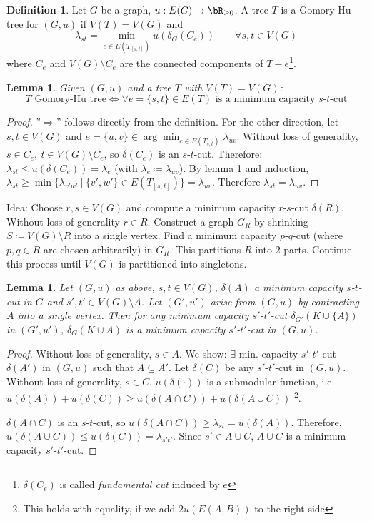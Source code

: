 \documentclass[11pt, a4paper]{article}
\newcommand{\set}[1]{\{#1\}}
\newtheorem{lemma}[theorem]{Lemma}
\theoremstyle{remark}
\theoremstyle{definition}
\newtheorem{definition}[theorem]{Definition}
\begin{document}
\begin{definition}
	Let $G$ be a graph, $u: E(G)\to\bR_{\geq0}$. A tree $T$ is a
	Gomory-Hu tree for $(G,u)$ if $V(T)=V(G)$ and
	\[\lambda_{st}=\min_{e\in E(T_{[s,t]})}u(\delta_G(C_e)) \qquad \forall s,t\in V(G)\]
	where $C_e$ and $V(G)\setminus C_e$ are the connected components of
	$T-e$\footnote{$\delta(C_e)$ is called \emph{fundamental cut} induced
		by $e$}.
\end{definition}

\begin{lemma}\label{lemma:min-cut-triangle}
	Given $(G,u)$ and a tree $T$ with $V(T)=V(G)$:
	\[T\text{ Gomory-Hu tree}\Leftrightarrow \forall e=\set{s,t}\in E(T)
		\text{ is a minimum capacity $s$-$t$-cut}\]
\end{lemma}
\begin{proof}
	''$\Rightarrow$'' follows directly from the definition. For the other
	direction, let $s,t\in V(G)$ and $e=\set{u,v}\in \arg\min_{e\in E(T_{s,t})}
		\lambda_{uv}$. Without loss of generality, $s\in C_e,\ t\in V(G)\setminus C_e$,
	so $\delta(C_e)$ is an $s$-$t$-cut. Therefore: $\lambda_{st}\leq u(\delta(C_e))
		=\lambda_e$ (with $\lambda_e\coloneqq \lambda_{uv}$). By lemma
	\ref{lemma:min-cut-triangle} and induction, $\lambda_{st}\geq\min\set{\lambda_{v'w'}\
			|\ \set{v',w'}\in E(T_{[s,t]})}=\lambda_{uv}$. Therefore $\lambda_{st}=
		\lambda_{uv}$.
\end{proof}

Idea: Choose $r,s\in V(G)$ and compute a minimum capacity $r$-$s$-cut
$\delta(R)$. Without loss of generality $r\in R$. Construct a graph
$G_R$ by shrinking $S\coloneqq V(G)\setminus R$ into a single vertex.
Find a minimum capacity $p$-$q$-cut (where $p,q\in R$ are chosen
arbitrarily) in $G_R$. This partitions $R$ into 2 parts. Continue
this process until $V(G)$ is partitioned into singletons.

\begin{lemma}\label{lemma:min-cut-contraction}
	Let $(G,u)$ as above, $s,t\in V(G)$, $\delta(A)$ a minimum capacity
	$s$-$t$-cut in $G$ and $s',t'\in V(G)\setminus A$. Let $(G',u')$ arise
	from $(G,u)$ by contracting $A$ into a single vertex. Then for any
	minimum capacity $s'$-$t'$-cut $\delta_{G'}(K\cup\set{A})$ in $(G',u')$,
	$\delta_G(K\cup A)$ is a minimum capacity $s'$-$t'$-cut in $(G,u)$.
\end{lemma}
\begin{proof}
	Without loss of generality, $s\in A$. We show: $\exists$ min. capacity
	$s'$-$t'$-cut $\delta(A')$ in $(G,u)$ such that $A\subseteq A'$. Let
	$\delta(C)$ be any $s'$-$t'$-cut in $(G,u)$. Without loss of generality,
	$s\in C$. $u(\delta(\cdot))$ is a submodular function, i.e.
	$u(\delta(A))+u(\delta(C))\geq u(\delta(A\cap C))+u(\delta(A\cup C))$
	\footnote{This holds with equality, if we add $2u(E(A,B))$ to the right side}.

	$\delta(A\cap C)$ is an $s$-$t$-cut, so $u(\delta(A\cap C))\geq \lambda_{st}
		=u(\delta(A))$. Therefore, $u(\delta(A\cup C))\leq u(\delta(C))=\lambda_{s't'}$.
	Since $s'\in A\cup C$, $A\cup C$ is a minimum capacity $s'$-$t'$-cut.
\end{proof}
\end{document}
